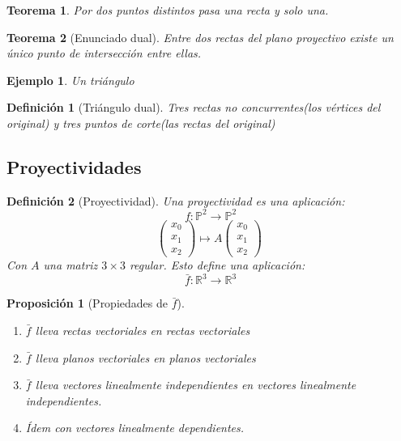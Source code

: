 \documentclass[11pt, a4paper]{article}
\newif\IfInSansMode
\newcommand{\R}{\mathbb{R}}
\theoremstyle{theorem-style}
\newtheorem{nth}{Teorema}[section]
\newtheorem{nprop}{Proposición}[section]
\theoremstyle{definition-style}
\newtheorem{ndef}{Definición}[section]
\theoremstyle{remark-style}
\theoremstyle{example-style}
\newtheorem{ejemplo}{Ejemplo}[section]
\newenvironment{nlist}
{\begin{enumerate}
    \renewcommand\labelenumi{(\emph{\roman{enumi})}}}
  {\end{enumerate}}
\begin{document}
\begin{nth}
	Por dos puntos distintos pasa una recta y solo una.
\end{nth}

\begin{nth}[Enunciado dual]
	Entre dos rectas del plano proyectivo existe un único punto de intersección entre ellas.
\end{nth}

\begin{ejemplo}
	Un triángulo
\end{ejemplo}
\begin{ndef}[Triángulo dual]
	Tres rectas no concurrentes(los vértices del original) y tres puntos de corte(las rectas del original)
\end{ndef}

\subsection{Proyectividades}

\begin{ndef}[Proyectividad]
	Una proyectividad es una aplicación:
	\[
	f: \mathbb P ^2 \to \mathbb P^2
	\]
	\[
	 \begin{pmatrix}
 x_0\\
 x_1\\
 x_2
\end{pmatrix}  \mapsto A  \begin{pmatrix}
 x_0\\
 x_1\\
 x_2
\end{pmatrix}  \
	\]
	Con $A$ una matriz $3\times 3$ regular. Esto define una aplicación:
	\[
	\bar{f} : \R^3 \to \R^3 
	\]
	
\end{ndef}

\begin{nprop}[Propiedades de $\bar{f}$]\hfill
	\begin{nlist}
	\item $\bar{f}$ lleva rectas vectoriales en rectas vectoriales
	\item $\bar{f}$ lleva planos vectoriales en planos vectoriales
	\item $\bar{f}$ lleva vectores linealmente independientes en vectores linealmente independientes.
	\item Ídem con vectores linealmente dependientes.
\end{nlist}
\end{nprop}
\end{document}
